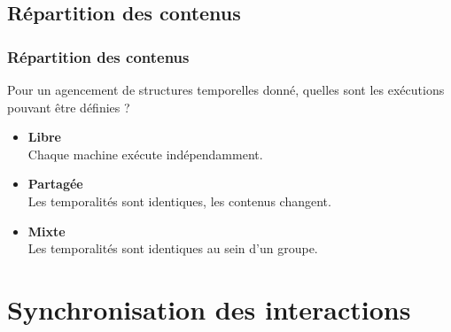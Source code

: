 \documentclass[handout]{beamer}
\begin{document}
\subsection{Répartition des contenus}
\begin{frame}
\frametitle{Répartition des contenus}
{\Large Pour un agencement de structures temporelles donné, quelles sont les exécutions pouvant être définies ?}
\large
\begin{itemize}
    \item<1> \textbf{Libre}~\\Chaque machine exécute indépendamment.
    \item<2> \textbf{Partagée}~\\Les temporalités sont identiques, les contenus changent.
    \item<3> \textbf{Mixte}~\\Les temporalités sont identiques au sein d'un groupe.
\end{itemize}
\end{frame}

\section{Synchronisation des interactions}
\end{document}
